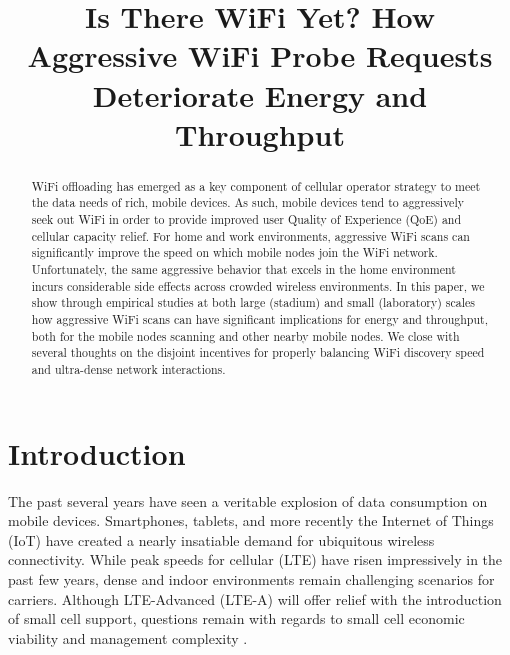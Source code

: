 \documentclass[conference]{IEEEtran}
\begin{document}
\title{Is There WiFi Yet? How Aggressive WiFi Probe Requests Deteriorate Energy and Throughput}



\author{
}






\maketitle

\begin{abstract}
WiFi offloading has emerged as a key component of cellular operator strategy to meet the data needs of rich, mobile devices. As such, mobile devices tend to aggressively seek out WiFi in order to provide improved user Quality of Experience (QoE) and cellular capacity relief. For home and work environments, aggressive WiFi scans can significantly improve the speed on which mobile nodes join the WiFi network. Unfortunately, the same aggressive behavior that excels in the home environment incurs considerable side effects across crowded wireless environments. In this paper, we show through empirical studies at both large (stadium) and small (laboratory) scales how aggressive WiFi scans can have significant implications for energy and throughput, both for the mobile nodes scanning and other nearby mobile nodes. We close with several thoughts on the disjoint incentives for properly balancing WiFi discovery speed and ultra-dense network interactions.        

\end{abstract}




\section{Introduction}

The past several years have seen a veritable explosion of data consumption on mobile devices.  Smartphones, tablets, and more recently the Internet of Things (IoT) have created a nearly insatiable demand for ubiquitous wireless connectivity.   While peak speeds for cellular (LTE) have risen impressively in the past few years, dense and indoor environments remain challenging scenarios for carriers. Although LTE-Advanced (LTE-A) will offer relief with the introduction of small cell support, questions remain with regards to small cell economic viability and management complexity \cite{Andrews:ChallengeCell}.
\end{document}
